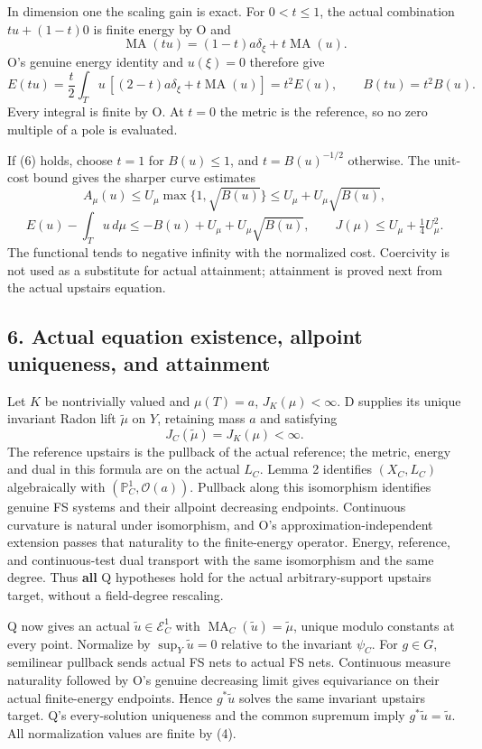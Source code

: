 \documentclass[
  11pt,
]{article}
\begin{document}
In dimension one the scaling gain is exact. For \(0<t\leq1\), the actual
combination \(tu+(1-t)0\) is finite energy by O and \[
\operatorname{MA}(tu)=(1-t)a\delta_\xi+t\operatorname{MA}(u).
\] O's genuine energy identity and \(u(\xi)=0\) therefore give \[
E(tu)=\frac t2\int_Tu\,[ (2-t)a\delta_\xi+t\operatorname{MA}(u)]
=t^2E(u),\qquad B(tu)=t^2B(u).
\tag{7}
\] Every integral is finite by O. At \(t=0\) the metric is the
reference, so no zero multiple of a pole is evaluated.

If (6) holds, choose \(t=1\) for \(B(u)\leq1\), and \(t=B(u)^{-1/2}\)
otherwise. The unit-cost bound gives the sharper curve estimates \[
A_\mu(u)\leq U_\mu\max\{1,\sqrt{B(u)}\}
\leq U_\mu+U_\mu\sqrt{B(u)},
\tag{8}
\] \[
E(u)-\int_Tu\,d\mu\leq-B(u)+U_\mu+U_\mu\sqrt{B(u)},
\qquad J(\mu)\leq U_\mu+\tfrac14U_\mu^2.
\tag{9}
\] The functional tends to negative infinity with the normalized cost.
Coercivity is not used as a substitute for actual attainment; attainment
is proved next from the actual upstairs equation.

\subsection{6. Actual equation existence, allpoint uniqueness, and
attainment}\label{actual-equation-existence-allpoint-uniqueness-and-attainment}

Let \(K\) be nontrivially valued and \(\mu(T)=a\), \(J_K(\mu)<\infty\).
D supplies its unique invariant Radon lift \(\widetilde\mu\) on \(Y\),
retaining mass \(a\) and satisfying \[
J_C(\widetilde\mu)=J_K(\mu)<\infty.
\tag{10}
\] The reference upstairs is the pullback of the actual reference; the
metric, energy and dual in this formula are on the actual \(L_C\). Lemma
2 identifies \((X_C,L_C)\) algebraically with
\((\mathbb P^1_C,\mathcal O(a))\). Pullback along this isomorphism
identifies genuine FS systems and their allpoint decreasing endpoints.
Continuous curvature is natural under isomorphism, and O's
approximation-independent extension passes that naturality to the
finite-energy operator. Energy, reference, and continuous-test dual
transport with the same isomorphism and the same degree. Thus
\textbf{all} Q hypotheses hold for the actual arbitrary-support upstairs
target, without a field-degree rescaling.

Q now gives an actual \(\widetilde u\in\mathcal E_C^1\) with
\(\operatorname{MA}_C(\widetilde u)=\widetilde\mu\), unique modulo
constants at every point. Normalize by \(\sup_Y\widetilde u=0\) relative
to the invariant \(\psi_C\). For \(g\in G\), semilinear pullback sends
actual FS nets to actual FS nets. Continuous measure naturality followed
by O's genuine decreasing limit gives equivariance on their actual
finite-energy endpoints. Hence \(g^*\widetilde u\) solves the same
invariant upstairs target. Q's every-solution uniqueness and the common
supremum imply \(g^*\widetilde u=\widetilde u\). All normalization
values are finite by (4).
\end{document}
